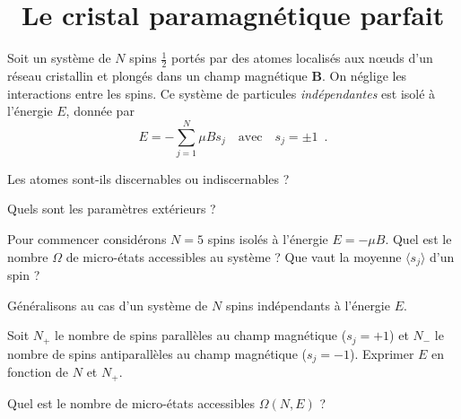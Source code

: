\documentclass[utf8, 11pt]{feuille}
\begin{document}
\section{\soft~Le cristal paramagnétique parfait}

Soit un système de $N$ spins $\frac12$ portés par des atomes localisés
aux n\oe uds d'un réseau cristallin et plongés dans un champ
magnétique $\mathbf{B}$. On néglige les interactions entre les
spins. Ce système de particules {\it indépendantes} est isolé à l'énergie
$E$, donnée par
$$
E = - \sum_{j=1}^{N} \mu B s_j \quad \textrm{avec} \quad s_j = \pm
1 \enspace .
$$

\question
Les atomes sont-ils discernables ou indiscernables ? 

\question
Quels sont les paramètres extérieurs ? 

\question
Pour commencer considérons $N=5$ spins isolés à l'énergie
  $E=-\mu B$. Quel est le nombre $\varOmega$ de micro-états accessibles
  au système ? Que vaut la moyenne $\langle s_j \rangle$ d'un spin ? 

\medskip

Généralisons au cas d'un système de $N$ spins indépendants à l'énergie $E$.

\question
Soit $N_+$ le nombre de spins parallèles au champ magnétique ($s_j=+1$) et $N_-$ le nombre de spins antiparallèles au champ magnétique ($s_j=-1$). Exprimer  $E$ en fonction de $N$ et $N_+$.  

\question
Quel est le nombre de micro-états accessibles $\varOmega (N,E)$ ?

\end{document}
